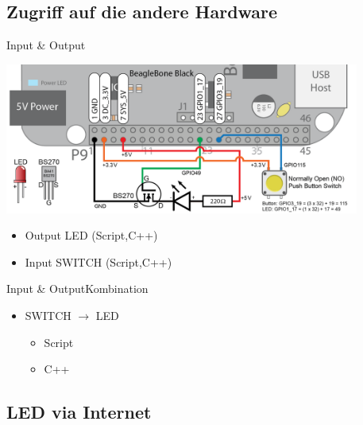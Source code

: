 \subsection{Zugriff auf die andere Hardware}

\begin{frame}{Input \& Output}
 \begin{center}
  \includegraphics[width=0.875\textwidth]{Button-and-LED-large.png}
 \end{center}
 \begin{itemize}
  \item Output LED (Script,C++)
  \item Input SWITCH (Script,C++)
 \end{itemize}
\end{frame}

\begin{frame}{Input \& Output}{Kombination}
 \begin{itemize}
  \item SWITCH $\to$ LED
  \begin{itemize}
   \item Script
   \item C++
  \end{itemize}
 \end{itemize}
\end{frame}

\subsection{LED via Internet}

